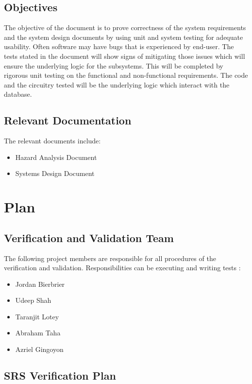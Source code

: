 \documentclass[12pt, titlepage]{article}
\begin{document}
\subsection{Objectives}

The objective of the document is to prove correctness of the system requirements and the system design documents by using unit and system testing for adequate usability. Often software may have bugs that is experienced by end-user. The tests stated in the document will show signs of mitigating those issues which will ensure the underlying logic for the subsystems. This will be completed by rigorous unit testing on the functional and non-functional requirements. The code and the circuitry tested will be the underlying logic which interact with the database.

\subsection{Relevant Documentation}

The relevant documents include:
\begin{itemize}
\item Hazard Analysis Document
\item Systems Design Document

\end{itemize}


\section{Plan}


\subsection{Verification and Validation Team}

The following project members are responsible for all procedures of the verification and validation. Responsibilities can be executing and writing tests :
\begin{itemize}
    \item Jordan Bierbrier 
    \item Udeep Shah
    \item Taranjit Lotey
    \item Abraham Taha
    \item Azriel Gingoyon
\end{itemize}

\subsection{SRS Verification Plan}
\end{document}
